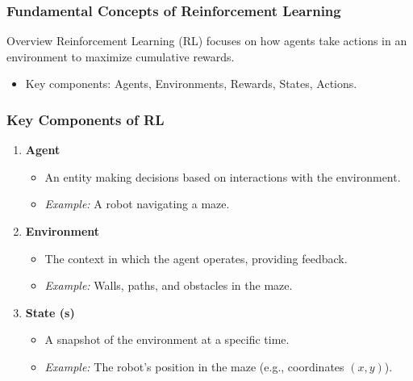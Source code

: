 \documentclass[aspectratio=169]{beamer}
\begin{document}
\begin{frame}[fragile]
    \frametitle{Fundamental Concepts of Reinforcement Learning}
    \begin{block}{Overview}
        Reinforcement Learning (RL) focuses on how agents take actions in an environment to maximize cumulative rewards.
    \end{block}
    \begin{itemize}
        \item Key components: Agents, Environments, Rewards, States, Actions.
    \end{itemize}
\end{frame}

\begin{frame}[fragile]
    \frametitle{Key Components of RL}
    \begin{enumerate}
        \item \textbf{Agent}
            \begin{itemize}
                \item An entity making decisions based on interactions with the environment.
                \item \textit{Example:} A robot navigating a maze.
            \end{itemize}
        \item \textbf{Environment}
            \begin{itemize}
                \item The context in which the agent operates, providing feedback.
                \item \textit{Example:} Walls, paths, and obstacles in the maze.
            \end{itemize}
        \item \textbf{State (s)}
            \begin{itemize}
                \item A snapshot of the environment at a specific time.
                \item \textit{Example:} The robot's position in the maze (e.g., coordinates \((x,y)\)).
            \end{itemize}
    \end{enumerate}
\end{frame}
\end{document}
